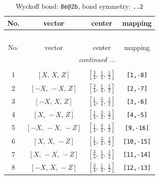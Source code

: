 \documentclass[fleqn,8pt]{jsarticle}
\begin{document}
\begin{longtable}{cccc}
\caption{Wyckoff bond: {\tt 8e@2b}, bond symmetry: {\tt ..2}}
 \\
 \hline \hline
No. & vector & center & mapping \\ \hline \endfirsthead

\multicolumn{3}{l}{\tablename\ \thetable{}} \\
 \hline \hline
No. & vector & center & mapping \\ \hline \endhead

 \hline \hline
\multicolumn{3}{r}{\footnotesize\it continued ...} \\ \endfoot

 \hline \hline
\multicolumn{3}{r}{} \\ \endlastfoot

1 & $\left[ X,\, X,\, Z \right]$ & $\left[ \frac{3}{4},\, \frac{1}{4},\, \frac{1}{2} \right]$ & {\tt [1,-8]} \\ \hline
2 & $\left[ - X,\, - X,\, Z \right]$ & $\left[ \frac{3}{4},\, \frac{1}{4},\, \frac{1}{2} \right]$ & {\tt [2,-7]} \\ \hline
3 & $\left[ - X,\, X,\, Z \right]$ & $\left[ \frac{1}{4},\, \frac{3}{4},\, \frac{1}{2} \right]$ & {\tt [3,-6]} \\ \hline
4 & $\left[ X,\, - X,\, Z \right]$ & $\left[ \frac{1}{4},\, \frac{3}{4},\, \frac{1}{2} \right]$ & {\tt [4,-5]} \\ \hline
5 & $\left[ - X,\, - X,\, - Z \right]$ & $\left[ \frac{1}{4},\, \frac{3}{4},\, \frac{1}{2} \right]$ & {\tt [9,-16]} \\ \hline
6 & $\left[ X,\, X,\, - Z \right]$ & $\left[ \frac{1}{4},\, \frac{3}{4},\, \frac{1}{2} \right]$ & {\tt [10,-15]} \\ \hline
7 & $\left[ X,\, - X,\, - Z \right]$ & $\left[ \frac{3}{4},\, \frac{1}{4},\, \frac{1}{2} \right]$ & {\tt [11,-14]} \\ \hline
8 & $\left[ - X,\, X,\, - Z \right]$ & $\left[ \frac{3}{4},\, \frac{1}{4},\, \frac{1}{2} \right]$ & {\tt [12,-13]} \\
\end{longtable}
\renewcommand{\arraystretch}{1.2}
\end{document}
